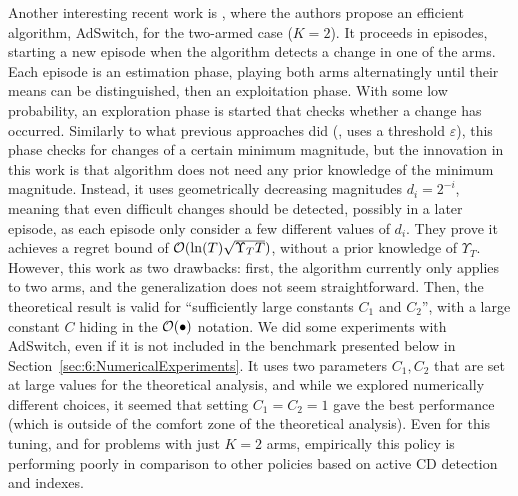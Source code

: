 Another interesting recent work is \cite{AuerGajaneOrtner18}, where the authors propose an efficient algorithm, AdSwitch, for the two-armed case ($K=2$).
It proceeds in episodes, starting a new episode when the algorithm detects a change in one of the arms. Each episode is an estimation phase, playing both arms alternatingly until their means can be distinguished, then an exploitation phase. With some low probability, an exploration phase is started that checks whether a change has occurred.
Similarly to what previous approaches did (\eg, \CUSUM{} uses a threshold $\varepsilon$), this phase checks for changes of a certain minimum magnitude, but the innovation in this work is that algorithm does not need any prior knowledge of the minimum magnitude.
Instead, it uses geometrically decreasing magnitudes $d_i = 2^{-i}$, meaning that even difficult changes should be detected, possibly in a later episode, as each episode only consider a few different values of $d_i$.
They prove it achieves a regret bound of $\mathcal{O}(\ln(T) \sqrt{\Upsilon_T T})$, without a prior knowledge of $\Upsilon_T$.
However, this work as two drawbacks:
first, the algorithm currently only applies to two arms, and the generalization does not seem straightforward.
Then, the theoretical result is valid for ``sufficiently large constants $C_1$ and $C_2$'', with a large constant $C$ hiding in the $\mathcal{O}(\bullet)$ notation.
We did some experiments with AdSwitch, even if it is not included in the benchmark presented below in Section~\ref{sec:6:NumericalExperiments}. It uses two parameters $C_1,C_2$ that are set at large values for the theoretical analysis,
and while we explored numerically different choices, it seemed that setting $C_1=C_2=1$ gave the best performance (which is outside of the comfort zone of the theoretical analysis). Even for this tuning, and for problems with just $K=2$ arms, empirically   this policy is performing poorly in comparison to other policies based on active CD detection and \klUCB{} indexes.


